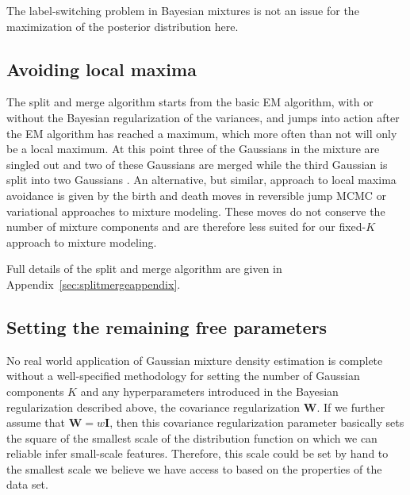 \documentclass[aoas,preprint,authoryear,round]{imsart}
\newcommand{\ten}[1]{\mathbf{#1}} %
\newcommand{\WW}{\ten{W}}
\newcommand{\II}{\ten{I}}
\begin{document}
The label-switching problem in Bayesian mixtures \citep{Jasra05a} is
not an issue for the maximization of the posterior distribution here.

\subsection{Avoiding local maxima}

The split and merge algorithm starts from the basic EM algorithm, with
or without the Bayesian regularization of the variances, and jumps
into action after the EM algorithm has reached a maximum, which more
often than not will only be a local maximum. At this point three of
the Gaussians in the mixture are singled out and two of these
Gaussians are merged while the third Gaussian is split into two
Gaussians \citep{Naonori1998}. An alternative, but similar, approach
to local maxima avoidance is given by the birth and death moves in
reversible jump MCMC \citep{Richardson97a} or variational approaches
\citep{Ghahramani00variationalinference,Beal03} to mixture
modeling. These moves do not conserve the number of mixture components
and are therefore less suited for our fixed-$K$ approach to mixture
modeling.

Full details of the split and merge algorithm are given in
Appendix~\ref{sec:splitmergeappendix}.


\subsection{Setting the remaining free parameters}\label{sec:Kw}

No real world application of Gaussian mixture density estimation is
complete without a well-specified methodology for setting the number
of Gaussian components $K$ and any hyperparameters introduced in the
Bayesian regularization described above, the covariance regularization
$\WW$. If we further assume that $\WW = w\II$, then this covariance
regularization parameter basically sets the square of the smallest
scale of the distribution function on which we can reliable infer
small-scale features. Therefore, this scale could be set by hand to
the smallest scale we believe we have access to based on the
properties of the data set.
\end{document}
